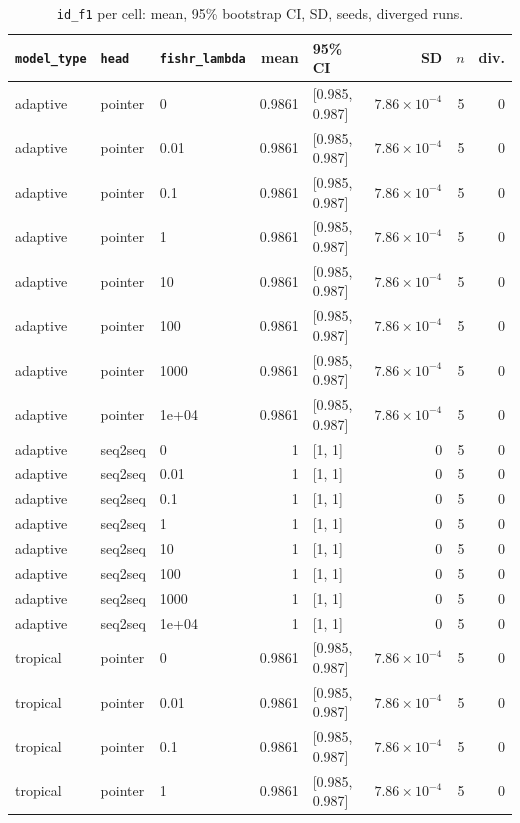 \documentclass[10pt]{article}
\begin{document}
{\small
\begin{longtable}{lllrlrrr}
\caption{\texttt{id\_f1} per cell: mean, 95\% bootstrap CI, SD, seeds, diverged runs.}\label{tab:summary-id_f1}\\
\toprule
\texttt{model\_type} & \texttt{head} & \texttt{fishr\_lambda} & mean & 95\% CI & SD & $n$ & div.\\
\midrule
\endhead
adaptive & pointer & 0 & 0.9861 & [0.985, 0.987] & $7.86\times10^{-4}$ & 5 & 0\\
adaptive & pointer & 0.01 & 0.9861 & [0.985, 0.987] & $7.86\times10^{-4}$ & 5 & 0\\
adaptive & pointer & 0.1 & 0.9861 & [0.985, 0.987] & $7.86\times10^{-4}$ & 5 & 0\\
adaptive & pointer & 1 & 0.9861 & [0.985, 0.987] & $7.86\times10^{-4}$ & 5 & 0\\
adaptive & pointer & 10 & 0.9861 & [0.985, 0.987] & $7.86\times10^{-4}$ & 5 & 0\\
adaptive & pointer & 100 & 0.9861 & [0.985, 0.987] & $7.86\times10^{-4}$ & 5 & 0\\
adaptive & pointer & 1000 & 0.9861 & [0.985, 0.987] & $7.86\times10^{-4}$ & 5 & 0\\
adaptive & pointer & 1e+04 & 0.9861 & [0.985, 0.987] & $7.86\times10^{-4}$ & 5 & 0\\
adaptive & seq2seq & 0 & 1 & [1, 1] & 0 & 5 & 0\\
adaptive & seq2seq & 0.01 & 1 & [1, 1] & 0 & 5 & 0\\
adaptive & seq2seq & 0.1 & 1 & [1, 1] & 0 & 5 & 0\\
adaptive & seq2seq & 1 & 1 & [1, 1] & 0 & 5 & 0\\
adaptive & seq2seq & 10 & 1 & [1, 1] & 0 & 5 & 0\\
adaptive & seq2seq & 100 & 1 & [1, 1] & 0 & 5 & 0\\
adaptive & seq2seq & 1000 & 1 & [1, 1] & 0 & 5 & 0\\
adaptive & seq2seq & 1e+04 & 1 & [1, 1] & 0 & 5 & 0\\
tropical & pointer & 0 & 0.9861 & [0.985, 0.987] & $7.86\times10^{-4}$ & 5 & 0\\
tropical & pointer & 0.01 & 0.9861 & [0.985, 0.987] & $7.86\times10^{-4}$ & 5 & 0\\
tropical & pointer & 0.1 & 0.9861 & [0.985, 0.987] & $7.86\times10^{-4}$ & 5 & 0\\
tropical & pointer & 1 & 0.9861 & [0.985, 0.987] & $7.86\times10^{-4}$ & 5 & 0\\

\end{longtable}}
\end{document}

